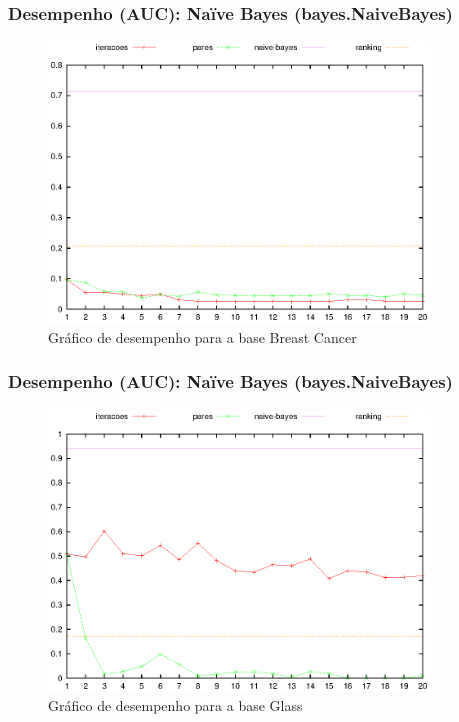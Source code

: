 \begin{frame}
    \frametitle{Desempenho (AUC): Naïve Bayes (bayes.NaiveBayes)}

    \begin{figure}[H]
        \centering
        \includegraphics[width=0.9\textwidth]{img/breast-cancer_naive-bayes.eps}
        \caption{Gráfico de desempenho para a base Breast Cancer}
    \end{figure}
\end{frame}

\begin{frame}
    \frametitle{Desempenho (AUC): Naïve Bayes (bayes.NaiveBayes)}

    \begin{figure}[H]
        \centering
        \includegraphics[width=0.9\textwidth]{img/glass_naive-bayes.eps}
        \caption{Gráfico de desempenho para a base Glass}
    \end{figure}
\end{frame}

